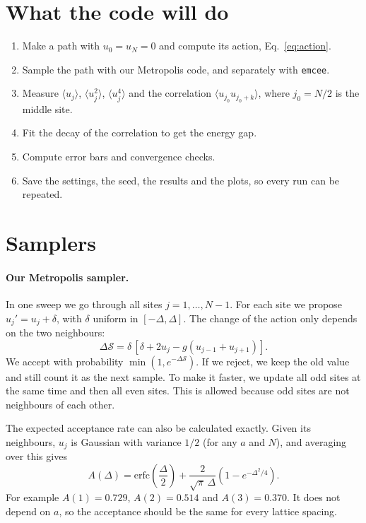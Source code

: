 \documentclass[11pt]{article}
\begin{document}
\section{What the code will do}
\begin{enumerate}
  \item Make a path with $u_0 = u_N = 0$ and compute its action, Eq.~\eqref{eq:action}.
  \item Sample the path with our Metropolis code, and separately with \texttt{emcee}.
  \item Measure $\langle u_j\rangle$, $\langle u_j^2\rangle$, $\langle u_j^4\rangle$ and the correlation $\langle u_{j_0} u_{j_0+k}\rangle$, where $j_0 = N/2$ is the middle site.
  \item Fit the decay of the correlation to get the energy gap.
  \item Compute error bars and convergence checks.
  \item Save the settings, the seed, the results and the plots, so every run can be repeated.
\end{enumerate}

\section{Samplers}
\paragraph{Our Metropolis sampler.} In one sweep we go through all sites $j = 1, \dots, N-1$. For each site we propose $u_j' = u_j + \delta$, with $\delta$ uniform in $[-\Delta, \Delta]$. The change of the action only depends on the two neighbours:
\begin{equation}
  \Delta\mathcal S = \delta\,[\delta + 2u_j - g(u_{j-1}+u_{j+1})].
  \label{eq:dS}
\end{equation}
We accept with probability $\min(1, e^{-\Delta \mathcal S})$. If we reject, we keep the old value and still count it as the next sample. To make it faster, we update all odd sites at the same time and then all even sites. This is allowed because odd sites are not neighbours of each other.

The expected acceptance rate can also be calculated exactly. Given its neighbours, $u_j$ is Gaussian with variance $1/2$ (for any $a$ and $N$), and averaging over this gives
\begin{equation}
  A(\Delta) = \mathrm{erfc}\!\left(\frac\Delta 2\right) + \frac{2}{\sqrt\pi\,\Delta}\left(1 - e^{-\Delta^2/4}\right).
  \label{eq:acc}
\end{equation}
For example $A(1) = 0.729$, $A(2) = 0.514$ and $A(3) = 0.370$. It does not depend on $a$, so the acceptance should be the same for every lattice spacing.
\end{document}
